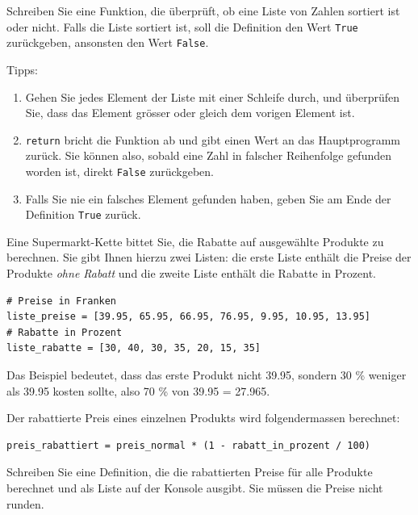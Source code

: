 \begin{mychallenge}
	Schreiben Sie eine Funktion, die überprüft, ob eine Liste von Zahlen sortiert ist oder nicht. Falls die Liste sortiert ist, soll die Definition den Wert \lstinline|True| zurückgeben, ansonsten den Wert \lstinline|False|.

	Tipps: %
	\begin{enumerate}
		\item Gehen Sie jedes Element der Liste mit einer Schleife durch, und überprüfen Sie, dass das Element grösser oder gleich dem vorigen Element ist.
		\item \lstinline|return| bricht die Funktion ab und gibt einen Wert an das Hauptprogramm zurück. Sie können also, sobald eine Zahl in falscher Reihenfolge gefunden worden ist, direkt \lstinline|False| zurückgeben.
		\item Falls Sie nie ein falsches Element gefunden haben, geben Sie am Ende der Definition \lstinline|True| zurück.
	\end{enumerate}
	\begin{myanswer}
		
	\end{myanswer}
\end{mychallenge}

\begin{myexercise}
	Eine Supermarkt-Kette bittet Sie, die Rabatte auf ausgewählte Produkte zu berechnen. Sie gibt Ihnen hierzu zwei Listen: die erste Liste enthält die Preise der Produkte \textit{ohne Rabatt} und die zweite Liste enthält die Rabatte in Prozent.

	\begin{lstlisting}
# Preise in Franken
liste_preise = [39.95, 65.95, 66.95, 76.95, 9.95, 10.95, 13.95] 
# Rabatte in Prozent
liste_rabatte = [30, 40, 30, 35, 20, 15, 35] 
\end{lstlisting}

	Das Beispiel bedeutet, dass das erste Produkt nicht 39.95, sondern 30 \% weniger als 39.95 kosten sollte, also 70 \% von 39.95 = 27.965.

	Der rabattierte Preis eines einzelnen Produkts wird folgendermassen berechnet:
	\begin{lstlisting}
preis_rabattiert = preis_normal * (1 - rabatt_in_prozent / 100)
\end{lstlisting}
	Schreiben Sie eine Definition, die die rabattierten Preise für alle Produkte berechnet und als Liste auf der Konsole ausgibt. Sie müssen die Preise nicht runden.

	\begin{myanswer}
		
	\end{myanswer}
\end{myexercise}

